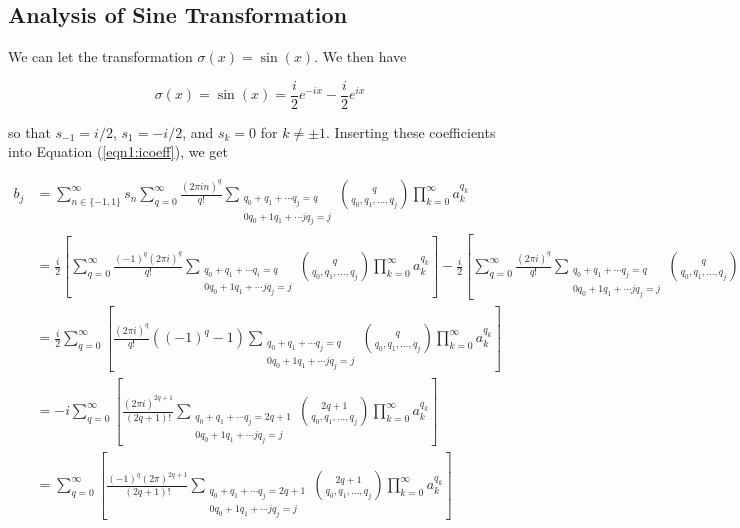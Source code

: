 \documentclass{article}
\begin{document}
    \subsection{Analysis of Sine Transformation}

    We can let the transformation $\sigma(x) = \sin(x)$. We then have

    \begin{equation}
        \sigma(x) = \sin(x) = \frac{i}{2} e^{-ix} - \frac{i}{2} e^{ix}
    \end{equation}

    so that $s_{-1} = i / 2$, $s_{1} = -i / 2$, and $s_{k} = 0$ for $k \neq \pm 1$. Inserting these coefficients into Equation (\ref{eqn1:icoeff}), we get

    \begin{align}
        b_j
        &= \sum_{n \in \{-1, 1\}}^{\infty} s_n \sum_{q=0}^{\infty} \frac{(2\pi in)^q}{q!} \sum_{\substack{q_0 + q_1 + \cdots q_j = q \\ 0q_0 + 1q_1 + \cdots jq_j = j}} \binom{q}{q_0, q_1, \ldots, q_j} \prod_{k=0}^{\infty} a_k^{q_k} \nonumber \\
        &= \frac{i}{2} \left[ \sum_{q=0}^{\infty} \frac{(-1)^q(2\pi i)^q}{q!} \sum_{\substack{q_0 + q_1 + \cdots q_i = q \\ 0q_0 + 1q_1 + \cdots jq_j = j}} \binom{q}{q_0, q_1, \ldots, q_j} \prod_{k=0}^{\infty} a_k^{q_k}\right] - \frac{i}{2} \left[ \sum_{q=0}^{\infty} \frac{(2\pi i)^q}{q!} \sum_{\substack{q_0 + q_1 + \cdots q_j = q \\ 0q_0 + 1q_1 + \cdots jq_j = j}} \binom{q}{q_0, q_1, \ldots, q_j} \prod_{k=0}^{\infty} a_k^{q_k}\right] \nonumber \\
        &= \frac{i}{2} \sum_{q=0}^{\infty} \left[\frac{(2\pi i)^q}{q!}\left((-1)^q - 1\right) \sum_{\substack{q_0 + q_1 + \cdots q_j = q \\ 0q_0 + 1q_1 + \cdots jq_j = j}} \binom{q}{q_0, q_1, \ldots, q_j} \prod_{k=0}^{\infty} a_k^{q_k}\right] \nonumber \\
        &= -i \sum_{q=0}^{\infty} \left[\frac{(2\pi i)^{2q + 1}}{(2q+1)!} \sum_{\substack{q_0 + q_1 + \cdots q_j = 2q + 1 \\ 0q_0 + 1q_1 + \cdots jq_j = j}} \binom{2q + 1}{q_0, q_1, \ldots, q_j} \prod_{k=0}^{\infty} a_k^{q_k}\right] \nonumber \\
        &= \sum_{q=0}^{\infty} \left[\frac{(-1)^{q}(2\pi)^{2q + 1}}{(2q+1)!} \sum_{\substack{q_0 + q_1 + \cdots q_j = 2q + 1 \\ 0q_0 + 1q_1 + \cdots jq_j = j}} \binom{2q + 1}{q_0, q_1, \ldots, q_j} \prod_{k=0}^{\infty} a_k^{q_k}\right]
    \end{align}
\end{document}
